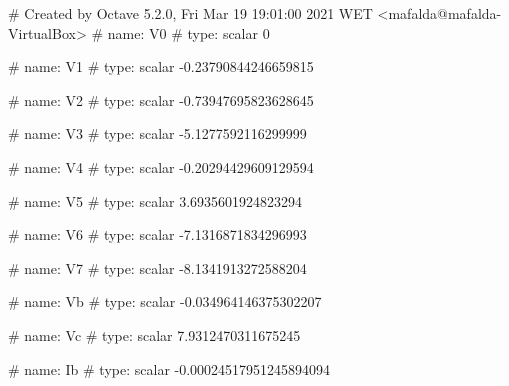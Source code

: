# Created by Octave 5.2.0, Fri Mar 19 19:01:00 2021 WET <mafalda@mafalda-VirtualBox>
# name: V0
# type: scalar
0


# name: V1
# type: scalar
-0.23790844246659815


# name: V2
# type: scalar
-0.73947695823628645


# name: V3
# type: scalar
-5.1277592116299999


# name: V4
# type: scalar
-0.20294429609129594


# name: V5
# type: scalar
3.6935601924823294


# name: V6
# type: scalar
-7.1316871834296993


# name: V7
# type: scalar
-8.1341913272588204


# name: Vb
# type: scalar
-0.034964146375302207


# name: Vc
# type: scalar
7.9312470311675245


# name: Ib
# type: scalar
-0.00024517951245894094


